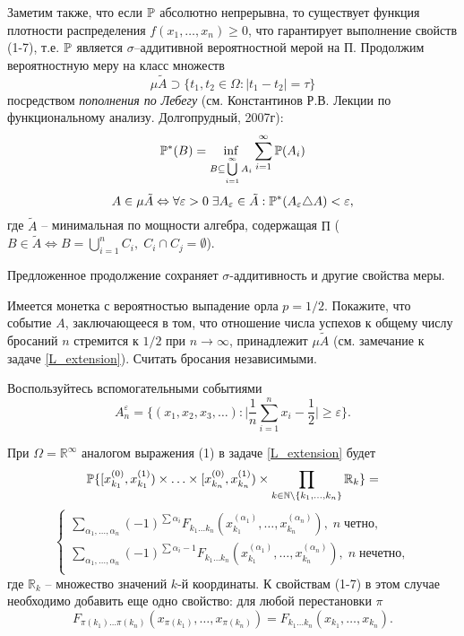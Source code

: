 \begin{remark}
Заметим также, что если $\mathrm{{\mathbb P}}$ абсолютно непрерывна, то существует функция плотности распределения  $f(x_1 ,\ldots, x_n ) \geq 0$, что гарантирует выполнение свойств (1-7), т.е. $\mathrm{{\mathbb P}}$ является  $\sigma$–аддитивной вероятностной мерой на  $\text{П}$.
Продолжим вероятностную меру на класс множеств 
\[\mu \tilde{A} \supset \{t_1, t_2 \in \Omega: |t_1 - t_2| =\tau \}\]
посредством \textit{пополнения по Лебегу} (см. Константинов Р.В. Лекции по функциональному анализу. Долгопрудный, 2007г):
\[
\mathrm{{\mathbb P}}^{*}(B) = \inf \limits_{B \subseteq \bigcup \limits_{i=1}^{\infty} A_i} \sum \limits_{i=1}^{\infty} \mathrm{{\mathbb P}}(A_i)
\]
 \[
 A \in \mu \tilde{A} \Leftrightarrow  \forall \varepsilon >0 \; \exists A_\varepsilon \in \tilde{A}:  \mathrm{{\mathbb P}}^{*}(A_\varepsilon \triangle A) < \varepsilon,
 \] 
где $\tilde{A}$ --  минимальная по мощности алгебра, содержащая $\text{П}$ ($B \in \tilde{A} \Leftrightarrow B = \bigcup \limits_{i=1}^n C_i, \; C_i \cap C_j  = \emptyset$).

Предложенное продолжение сохраняет $\sigma$-аддитивность и другие свойства меры.  

\end{remark}

\begin{problem}
Имеется монетка с вероятностью выпадение орла $p=1/2$. Покажите, что событие $A$, заключающееся в том, что отношение числа успехов к
общему числу бросаний $n$ стремится к $1/2$ при $n \to \infty$, принадлежит $\mu \tilde{A}$ (см. замечание к задаче \ref{L_extension}). Считать бросания независимыми.
\end{problem}

\begin{ordre}
Воспользуйтесь вспомогательными событиями 
\[
A_n^\varepsilon = \Bigg\{ (x_1, x_2, x_3, \ldots):\Bigg| \frac{1}{n}\sum \limits_{i=1}^n x_i -\frac{1}{2} \Bigg| \geq \varepsilon \Bigg\}.
\]
\end{ordre}

\begin{remark}
При $\Omega = \mathbb{R}^\infty$ аналогом выражения (1) в задаче \ref{L_extension} будет
\[
\mathrm{{\mathbb P}}\{ [x_{k_1}^{(0)}, x_{k_1}^{(1)})\times \ldots \times [x_{k_n}^{(0)},  x_{k_n}^{(1)} )\times \prod \limits_{k \in \mathbb{N} \setminus \{k_1, \ldots, k_n\} }  \mathbb{R}_k  \} = 
\]
\[
\begin{cases}
\sum \limits_{\alpha_1, \ldots, \alpha_n} (-1)^{\sum \alpha_i} F_{k_1 \ldots k_n}\left(x_{k_1}^{(\alpha_1)} ,\ldots, x_{k_n}^{(\alpha_n)} \right) ,  \; n \; \text{четно}, \\
\sum \limits_{\alpha_1, \ldots, \alpha_n} (-1)^{\sum \alpha_i - 1} F_{k_1 \ldots k_n}\left( x_{k_1}^{(\alpha_1)} ,\ldots, x_{k_n}^{(\alpha_n)} \right)  ,  \; n \; \text{нечетно},\\
\end{cases}
\]
где $\mathbb{R}_k$ -- множество значений $k$-й координаты. 
К свойствам (1-7) в этом случае необходимо добавить еще одно свойство:
 для любой перестановки  $\pi$ 
\[
 F_{\pi(k_1) \ldots \pi(k_n)} \left(x_{\pi(k_1)} ,\ldots, x_{\pi(k_n)} \right) =  F_{k_1 \ldots k_n}\left(x_{k_1} ,\ldots, x_{k_n}\right). 
\]

\end{remark}


